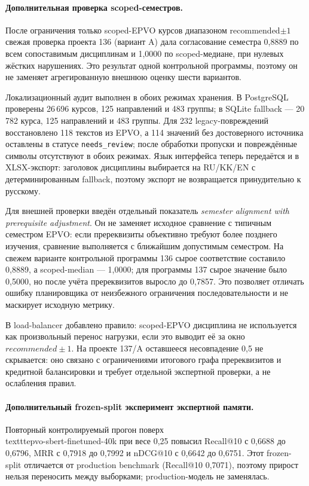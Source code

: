 \documentclass[twoside,11pt]{article}
\begin{document}
\paragraph{Дополнительная проверка scoped-семестров.}
После ограничения только scoped-EPVO курсов диапазоном recommended$\pm1$ свежая проверка проекта 136 (вариант A) дала согласование семестра 0,8889 по всем сопоставимым дисциплинам и 1,0000 по scoped-медиане, при нулевых жёстких нарушениях. Это результат одной контрольной программы, поэтому он не заменяет агрегированную внешнюю оценку шести вариантов.

Локализационный аудит выполнен в обоих режимах хранения. В PostgreSQL проверены 26\,696 курсов, 125 направлений и 483 группы; в SQLite fallback — 20\,782 курса, 125 направлений и 483 группы. Для 232 legacy-повреждений восстановлено 118 текстов из EPVO, а 114 значений без достоверного источника оставлены в статусе \texttt{needs\_review}; после обработки пропуски и повреждённые символы отсутствуют в обоих режимах. Язык интерфейса теперь передаётся и в XLSX-экспорт: заголовок дисциплины выбирается на RU/KK/EN с детерминированным fallback, поэтому экспорт не возвращается принудительно к русскому.

Для внешней проверки введён отдельный показатель \emph{semester alignment with prerequisite adjustment}. Он не заменяет исходное сравнение с типичным семестром EPVO: если пререквизиты объективно требуют более позднего изучения, сравнение выполняется с ближайшим допустимым семестром. На свежем варианте контрольной программы 136 сырое соответствие составило 0,8889, а scoped-median — 1,0000; для программы 137 сырое значение было 0,5000, но после учёта пререквизитов выросло до 0,7857. Это позволяет отличать ошибку планировщика от неизбежного ограничения последовательности и не маскирует исходную метрику.

В load-balancer добавлено правило: scoped-EPVO дисциплина не используется как произвольный перенос нагрузки, если это выводит её за окно \(recommended\pm1\). На проекте 137/A оставшееся несовпадение 0,5 не скрывается: оно связано с ограничениями итогового графа пререквизитов и кредитной балансировки и требует отдельной экспертной проверки, а не ослабления правил.

\paragraph{Дополнительный frozen-split эксперимент экспертной памяти.}
Повторный контролируемый прогон поверх \\texttt{epvo-sbert-finetuned-40k} при весе 0,25 повысил Recall@10 с 0,6688 до 0,6796, MRR с 0,7918 до 0,7992 и nDCG@10 с 0,6642 до 0,6751. Этот frozen-split отличается от production benchmark (Recall@10 0,7071), поэтому прирост нельзя переносить между выборками; production-модель не заменялась.
\end{document}
